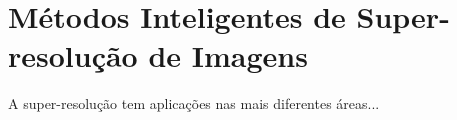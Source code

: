 % 
% 
% 
% 
\section{Métodos Inteligentes de Super-resolução de Imagens}

A super-resolução tem aplicações nas mais diferentes áreas...

